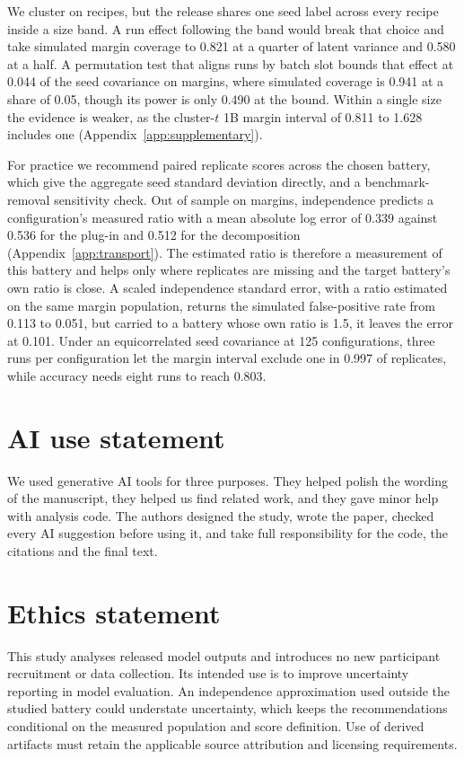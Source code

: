 \documentclass{article}
\begin{document}
We cluster on recipes, but the release shares one seed label across every recipe inside a size band. A run effect following the band would break that choice and take simulated margin coverage to 0.821 at a quarter of latent variance and 0.580 at a half. A permutation test that aligns runs by batch slot bounds that effect at 0.044 of the seed covariance on margins, where simulated coverage is 0.941 at a share of 0.05, though its power is only 0.490 at the bound. Within a single size the evidence is weaker, as the cluster-$t$ 1B margin interval of 0.811 to 1.628 includes one (Appendix~\ref{app:supplementary}).

For practice we recommend paired replicate scores across the chosen battery, which give the aggregate seed standard deviation directly, and a benchmark-removal sensitivity check. Out of sample on margins, independence predicts a configuration's measured ratio with a mean absolute log error of 0.339 against 0.536 for the plug-in and 0.512 for the decomposition (Appendix~\ref{app:transport}). The estimated ratio is therefore a measurement of this battery and helps only where replicates are missing and the target battery's own ratio is close. A scaled independence standard error, with a ratio estimated on the same margin population, returns the simulated false-positive rate from 0.113 to 0.051, but carried to a battery whose own ratio is 1.5, it leaves the error at 0.101. Under an equicorrelated seed covariance at 125 configurations, three runs per configuration let the margin interval exclude one in 0.997 of replicates, while accuracy needs eight runs to reach 0.803.

\label{maintext:end}
\section*{AI use statement}
We used generative AI tools for three purposes. They helped polish the wording of the manuscript, they helped us find related work, and they gave minor help with analysis code. The authors designed the study, wrote the paper, checked every AI suggestion before using it, and take full responsibility for the code, the citations and the final text.

\section*{Ethics statement}
This study analyses released model outputs and introduces no new participant recruitment or data collection. Its intended use is to improve uncertainty reporting in model evaluation. An independence approximation used outside the studied battery could understate uncertainty, which keeps the recommendations conditional on the measured population and score definition. Use of derived artifacts must retain the applicable source attribution and licensing requirements.
\end{document}

